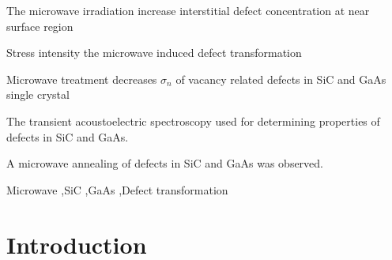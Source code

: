 \documentclass[final,3p,times,twocolumn,authoryear]{elsarticle}
\begin{document}
\begin{frontmatter}

\begin{highlights}
\item
The microwave irradiation increase interstitial defect concentration at near surface region

\item
Stress intensity the microwave induced defect transformation

\item
Microwave treatment decreases $\sigma_n$ of vacancy related defects in SiC and GaAs single crystal

\item
The transient acoustoelectric spectroscopy used for determining properties of defects in SiC and GaAs.

\item
A microwave annealing of defects in SiC and GaAs was observed.

\end{highlights}

\begin{keyword}
Microwave
\sep SiC
\sep GaAs
\sep Defect transformation
\end{keyword}

\end{frontmatter}


\section{Introduction}\label{sec1}
\end{document}
